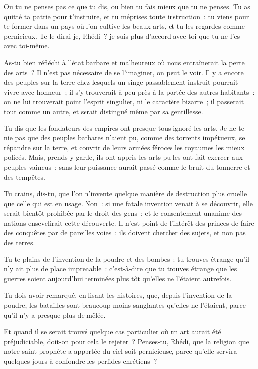 \documentclass[french,twoside]{book} %
\begin{document}
\noindent Ou tu ne penses pas ce que tu dis, ou bien tu fais mieux que tu ne penses. Tu as quitté ta patrie pour t’instruire, et tu méprises toute instruction : tu viens pour te former dans un pays où l’on cultive les beaux-arts, et tu les regardes comme pernicieux. Te le dirai-je, Rhédi ? je suis plus d’accord avec toi que tu ne l’es avec toi-même.\par
As-tu bien réfléchi à l’état barbare et malheureux où nous entraînerait la perte des arts ? Il n’est pas nécessaire de se l’imaginer, on peut le voir. Il y a encore des peuples sur la terre chez lesquels un singe passablement instruit pourrait vivre avec honneur ; il s’y trouverait à peu près à la portée des autres habitants : on ne lui trouverait point l’esprit singulier, ni le caractère bizarre ; il passerait tout comme un autre, et serait distingué même par sa gentillesse.\par
Tu dis que les fondateurs des empires ont presque tous ignoré les arts. Je ne te nie pas que des peuples barbares n’aient pu, comme des torrents impétueux, se répandre sur la terre, et couvrir de leurs armées féroces les royaumes les mieux policés. Mais, prends-y garde, ils ont appris les arts pu les ont fait exercer aux peuples vaincus ; sans leur puissance aurait passé comme le bruit du tonnerre et des tempêtes.\par
Tu crains, dis-tu, que l’on n’invente quelque manière de destruction plus cruelle que celle qui est en usage. Non : si une fatale invention venait à se découvrir, elle serait bientôt prohibée par le droit des gens ; et le consentement unanime des nations ensevelirait cette découverte. Il n’est point de l’intérêt des princes de faire des conquêtes par de pareilles voies : ils doivent chercher des sujets, et non pas des terres.\par
Tu te plains de l’invention de la poudre et des bombes : tu trouves étrange qu’il n’y ait plus de place imprenable : c’est-à-dire que tu trouves étrange que les guerres soient aujourd’hui terminées plus tôt qu’elles ne l’étaient autrefois.\par
Tu dois avoir remarqué, en lisant les histoires, que, depuis l’invention de la poudre, les batailles sont beaucoup moins sanglantes qu’elles ne l’étaient, parce qu’il n’y a presque plus de mêlée.\par
Et quand il se serait trouvé quelque cas particulier où un art aurait été préjudiciable, doit-on pour cela le rejeter ? Penses-tu, Rhédi, que la religion que notre saint prophète a apportée du ciel soit pernicieuse, parce qu’elle servira quelques jours à confondre les perfides chrétiens ?\par
\end{document}
